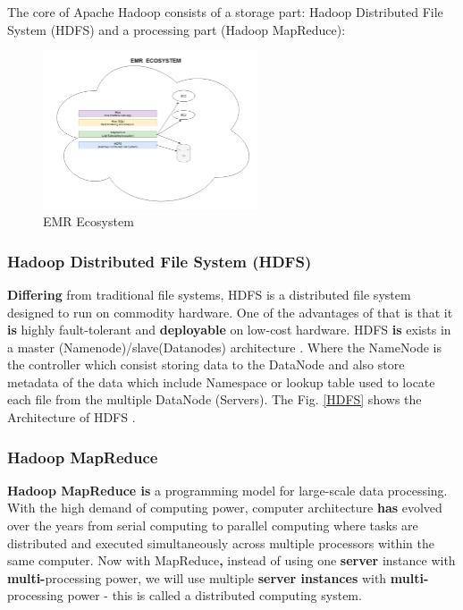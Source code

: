 \documentclass[journal]{IEEEtran}
\begin{document}
	The core of Apache Hadoop consists of a storage part: Hadoop Distributed File System (HDFS) and a processing part (Hadoop MapReduce):
	
	\begin{figure}
		\centering
		\includegraphics[width=2.5in]{EMR_Ecosystem.png}
		\caption{EMR Ecosystem}
		\label{EMR}
	\end{figure}
	
	\subsubsection{Hadoop Distributed File System (HDFS)}
	
	\textbf{Differing} from traditional file systems, HDFS is a distributed file system designed to run on commodity hardware. One of the advantages of that is that it \textbf{is} highly fault-tolerant and \textbf{deployable} on low-cost hardware. HDFS \textbf{is} exists in a master (Namenode)/slave(Datanodes) architecture \cite{HDFSarchitecture}. Where the NameNode is the controller which consist storing data to the DataNode and also store metadata of the data which include Namespace or lookup table used to locate each file from the multiple DataNode (Servers). The Fig. \ref{HDFS} shows the Architecture of HDFS \cite{HDFS}.
	
	\subsubsection{Hadoop MapReduce}
	
	\textbf{Hadoop MapReduce is} a programming model for large-scale data processing. With the high demand of computing power, computer architecture \textbf{has} evolved over the years from serial computing to parallel computing where tasks are distributed and executed simultaneously across multiple processors within the same computer. Now with MapReduce\textbf{,} instead of using one \textbf{server} instance with \textbf{multi-}processing power, we will use multiple \textbf{server instances} with \textbf{multi-}processing power - this is called a distributed computing system.
	
\end{document}
